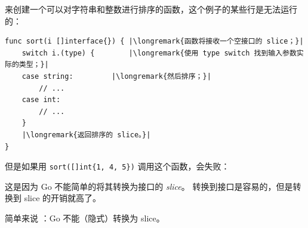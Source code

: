 来创建一个可以对字符串和整数进行排序的函数，这个例子的某些行是无法运行的：
\begin{lstlisting}
func sort(i []interface{}) { |\longremark{函数将接收一个空接口的 slice；}|
    switch i.(type) {        |\longremark{使用 type switch 找到输入参数实际的类型；}|
	case string:         |\longremark{然后排序；}|
	    // ...
	case int:
	    // ...
    }
    |\longremark{返回排序的 slice。}|
}
\end{lstlisting}
\showremarks
但是如果用 \lstinline|sort([]int{1, 4, 5})| 调用这个函数，会失败：

这是因为 Go 不能简单的将其转换为接口的 \emph{slice}。
转换到接口是容易的，但是转换到 slice 的开销就高了。

简单来说
：Go 不能（隐式）转换为 slice。

